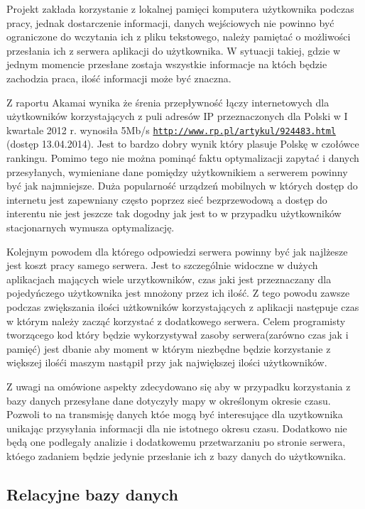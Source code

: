 Projekt zakłada korzystanie z lokalnej pamięci komputera użytkownika podczas pracy, jednak dostarczenie informacji, danych wejściowych nie powinno być ograniczone do wczytania ich z pliku tekstowego, należy pamiętać o możliwości przesłania ich z serwera aplikacji do użytkownika. W sytuacji takiej, gdzie w jednym momencie przesłane zostaja wszystkie informacje na któch będzie zachodzia praca, ilość informacji może być znaczna.

Z raportu Akamai wynika że śrenia przepływność łączy internetowych dla użytkowników korzystających z puli adresów IP przeznaczonych dla Polski w I kwartale 2012 r. wynosiła 5Mb/s  \underline{\texttt{http://www.rp.pl/artykul/924483.html}} (dostęp 13.04.2014). Jest to bardzo dobry wynik który plasuje Polskę w czołówce rankingu. Pomimo tego nie można pominąć faktu optymalizacji zapytać i danych przesyłanych, wymieniane dane pomiędzy użytkownikiem a serwerem powinny być jak najmniejsze. Duża popularność urządzeń mobilnych w których dostęp do internetu jest zapewniany często poprzez sieć bezprzewodową a dostęp do interentu nie jest jeszcze tak dogodny jak jest to w przypadku użytkowników stacjonarnych  wymusza optymalizację.

Kolejnym powodem dla którego odpowiedzi serwera powinny być jak najlżesze jest koszt pracy samego serwera. Jest to szczególnie widoczne w dużych aplikacjach mających wiele urzytkowników, czas jaki jest przeznaczany dla pojedyńczego użytkownika jest mnożony przez ich ilość. Z tego powodu zawsze podczas zwiększania ilości użtkowników korzystających z aplikacji następuje czas w którym należy zacząć korzystać z dodatkowego serwera. Celem programisty tworzącego kod który będzie wykorzystywał zasoby serwera(zarówno czas jak i pamięć) jest dbanie aby moment w którym niezbędne będzie korzystanie z większej ilośći maszym nastąpił przy jak największej ilości użytkowników.

Z uwagi na omówione aspekty zdecydowano się aby w przypadku korzystania z bazy danych przesyłane dane dotyczyły mapy w określonym okresie czasu. Pozwoli to na transmisję danych któe mogą być interesujące dla uzytkownika unikając przysyłania informacji dla nie istotnego okresu czasu. Dodatkowo nie będą one podlegały analizie i dodatkowemu przetwarzaniu po stronie serwera, któego zadaniem będzie jedynie przesłanie ich z bazy danych do użytkownika.

\subsection{Relacyjne bazy danych}
\label{sec:relacyjne}


